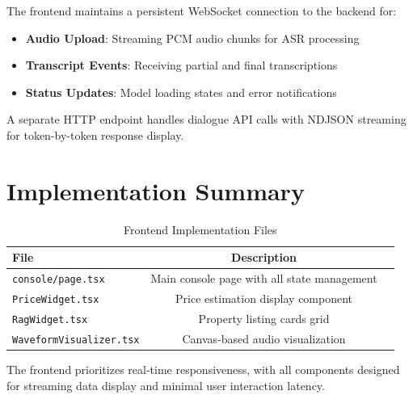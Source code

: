 The frontend maintains a persistent WebSocket connection to the backend for:

\begin{itemize}
    \item \textbf{Audio Upload}: Streaming PCM audio chunks for ASR processing
    \item \textbf{Transcript Events}: Receiving partial and final transcriptions
    \item \textbf{Status Updates}: Model loading states and error notifications
\end{itemize}

A separate HTTP endpoint handles dialogue API calls with NDJSON streaming for token-by-token response display.

\section{Implementation Summary}

\begin{table}[!htbp]
\centering
\caption{Frontend Implementation Files}
\label{tab:frontend-files}
\begin{tabular}{|l|c|l|}
\hline
\textbf{File} & \textbf{Description} \\ \hline
\texttt{console/page.tsx} & Main console page with all state management \\ \hline
\texttt{PriceWidget.tsx} & Price estimation display component \\ \hline
\texttt{RagWidget.tsx} & Property listing cards grid \\ \hline
\texttt{WaveformVisualizer.tsx} & Canvas-based audio visualization \\ \hline
\end{tabular}
\end{table}

The frontend prioritizes real-time responsiveness, with all components designed for streaming data display and minimal user interaction latency.
